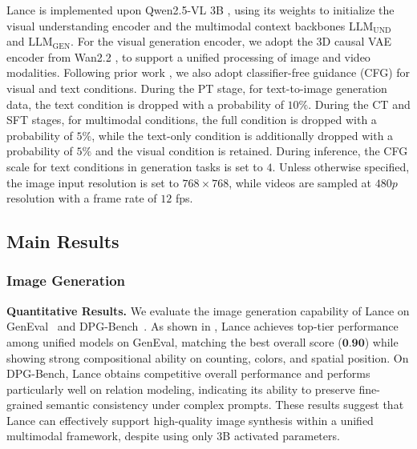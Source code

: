 \documentclass{llmxive}
\begin{document}
Lance is implemented upon Qwen2.5-VL 3B \cite{Qwen2.5-VL}, using its weights to initialize the visual understanding encoder and the multimodal context backbones $\mathrm{LLM}_{\mathrm{UND}}$ and $\mathrm{LLM}_{\mathrm{GEN}}$. For the visual generation encoder, we adopt the 3D causal VAE encoder from Wan2.2 \cite{wan2025wan}, to support a unified processing of image and video modalities.
Following prior work \cite{ho2022classifier}, we also adopt classifier-free guidance (CFG) for visual and text conditions. During the PT stage, for text-to-image generation data, the text condition is dropped with a probability of $10\%$.
During the CT and SFT stages, for multimodal conditions, the full condition is dropped with a probability of $5\%$, while the text-only condition is additionally dropped with a probability of $5\%$ and the visual condition is retained.
During inference, the CFG scale for text conditions in generation tasks is set to $4$. Unless otherwise specified, the image input resolution is set to $768 \times 768$, while videos are sampled at $480p$ resolution with a frame rate of $12$ fps.



\subsection{Main Results}




\subsubsection{Image Generation}

\textbf{Quantitative Results.}
We evaluate the image generation capability of Lance on GenEval~\cite{ghosh2023geneval} and DPG-Bench~\cite{hu2024ella}. As shown in , Lance achieves top-tier performance among unified models on GenEval, matching the best overall score ($\textbf{0.90}$) while showing strong compositional ability on counting, colors, and spatial position. On DPG-Bench, Lance obtains competitive overall performance and performs particularly well on relation modeling, indicating its ability to preserve fine-grained semantic consistency under complex prompts. These results suggest that Lance can effectively support high-quality image synthesis within a unified multimodal framework, despite using only $3$B activated parameters.
\end{document}
